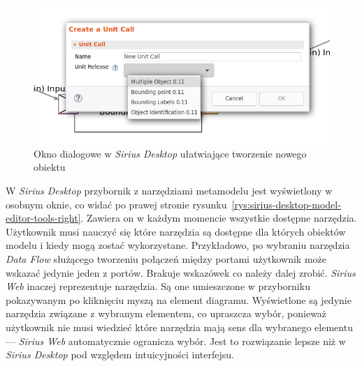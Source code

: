\begin{figure}[!hb]
  \centering

  \includegraphics[width=0.95\linewidth]{./images/sirius-desktop-create-unit-call-dialog.png}
  \caption{Okno dialogowe w \emph{Sirius Desktop} ułatwiające tworzenie nowego
    obiektu}\label{rys:sirius-desktop-create-unit-call-dialog}
\end{figure}

W \emph{Sirius Desktop} przybornik z narzędziami metamodelu jest wyświetlony
w osobnym oknie, co widać po prawej stronie
rysunku~\ref{rys:sirius-desktop-model-editor-tools-right}. Zawiera on w każdym
momencie wszystkie dostępne narzędzia.
Użytkownik musi nauczyć się które narzędzia są dostępne dla których obiektów
modelu i kiedy mogą zostać wykorzystane. Przykładowo, po wybraniu narzędzia
\emph{Data Flow} służącego tworzeniu połączeń między portami użytkownik może
wskazać jedynie jeden z portów. Brakuje wskazówek co należy dalej zrobić.
\emph{Sirius Web} inaczej reprezentuje narzędzia. Są one umieszczone w
przyborniku pokazywanym po kliknięciu myszą na element diagramu. Wyświetlone są
jedynie narzędzia związane z wybranym elementem, co upraszcza wybór, ponieważ
użytkownik nie musi wiedzieć które narzędzia mają sens dla wybranego elementu
--- \emph{Sirius Web} automatycznie ogranicza wybór. Jest to rozwiązanie lepsze
niż w \emph{Sirius Desktop} pod względem intuicyjności interfejsu.

